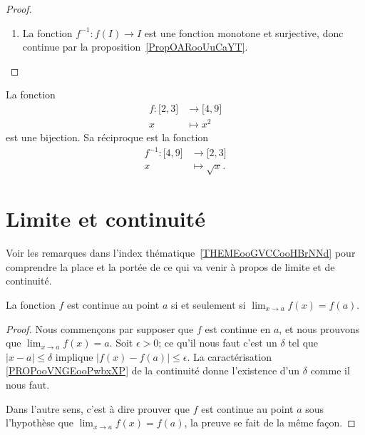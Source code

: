 \begin{proof}
\begin{enumerate}
\item

    La fonction \( f^{-1}\colon f(I)\to I\) est une fonction monotone et surjective, donc continue par la proposition~\ref{PropOARooUuCaYT}.

    \end{enumerate}
\end{proof}

\begin{example}
    La fonction
    \begin{equation}
        \begin{aligned}
            f\colon \mathopen[ 2 , 3 \mathclose]&\to \mathopen[ 4 , 9 \mathclose] \\
            x&\mapsto x^2
        \end{aligned}
    \end{equation}
    est une bijection. Sa réciproque est la fonction
    \begin{equation}
        \begin{aligned}
            f^{-1}\colon \mathopen[ 4 , 9 \mathclose]&\to \mathopen[ 2 , 3 \mathclose] \\
            x&\mapsto \sqrt{x}.
        \end{aligned}
    \end{equation}
\end{example}

\section{Limite et continuité}
\label{SecLimiteFontion}

Voir les remarques dans l'index thématique~\ref{THEMEooGVCCooHBrNNd} pour comprendre la place et la portée de ce qui va venir à propos de limite et de continuité.

\begin{theorem}           \label{ThoLimCont}
La fonction $f$ est continue au point $a$ si et seulement si $\lim_{x\to a}f(x)=f(a)$.
\end{theorem}

\begin{proof}
    Nous commençons par supposer que $f$ est continue en $a$, et nous prouvons que $\lim_{x\to a}f(x)=a$. Soit $\epsilon>0$; ce qu'il nous faut c'est un $\delta$ tel que $| x-a |\leq\delta$ implique $| f(x)-f(a) |\leq\epsilon$. La caractérisation \ref{PROPooVNGEooPwbxXP} de la continuité donne l'existence d'un $\delta$ comme il nous faut.

    Dans l'autre sens, c'est à dire prouver que $f$ est continue au point $a$ sous l'hypothèse que $\lim_{x\to a}f(x)=f(a)$, la preuve se fait de la même façon.
\end{proof}

